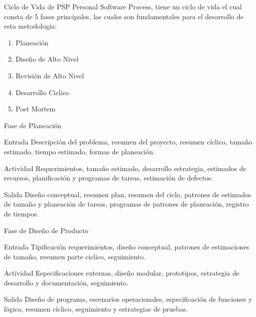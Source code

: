 \documentclass[]{beamer}
\begin{document}
			\begin{frame}{Ciclo de Vida de PSP}
				Personal Software Process, tiene un ciclo de vida el cual consta de 5 fases principales, las cuales son fundamentales para el desarrollo de esta metodología: \\ \pause
				\begin{enumerate}		
					\item Planeación \pause
					\item Diseño de Alto Nivel \pause
					\item Revisión de Alto Nivel \pause
					\item Desarrollo Ciclico \pause
					\item Post Mortem
				\end{enumerate}
			\end{frame}											
				
			\begin{frame}{Fase de Planeación}
				\begin{block}{Entrada}
					Descripción del problema, resumen del proyecto, resumen cíclico, tamaño estimado, tiempo estimado, formas de planeación.
				\end{block}
				\begin{block}{Actividad}
					Requerimientos, tamaño estimado, desarrollo estrategia, estimados de recursos, planificación y programas de tareas, estimación de defectos.
				\end{block}
				\begin{block}{Salida}
					Diseño conceptual, resumen plan, resumen del ciclo, patrones de estimados de tamaño y planeación de tareas, programas de patrones de planeación, registro de tiempos.
				\end{block}
			\end{frame}
			
			\begin{frame}{Fase de Diseño de Producto}
				\begin{block}{Entrada}
					Tipificación requerimientos, diseño conceptual, patrones de estimaciones de tamaño, resumen parte ciclico, seguimiento.
				\end{block}
				\begin{block}{Actividad}
					Especificaciones externas, diseño modular, prototipos, estrategia de desarrollo y documentación, seguimiento.
				\end{block}
				\begin{block}{Salida}
					Diseño de programa, escenarios operacionales, especificación de funciones y lógica, resumen cíclico, seguimiento y estrategias de pruebas.
				\end{block}
			\end{frame}
\end{document}
